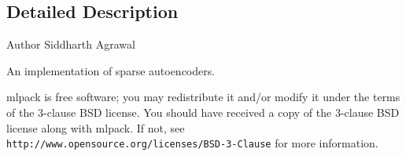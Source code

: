 \subsection{Detailed Description}
\begin{DoxyAuthor}{Author}
Siddharth Agrawal
\end{DoxyAuthor}
An implementation of sparse autoencoders.

mlpack is free software; you may redistribute it and/or modify it under the terms of the 3-\/clause B\+SD license. You should have received a copy of the 3-\/clause B\+SD license along with mlpack. If not, see {\tt http\+://www.\+opensource.\+org/licenses/\+B\+S\+D-\/3-\/\+Clause} for more information. 